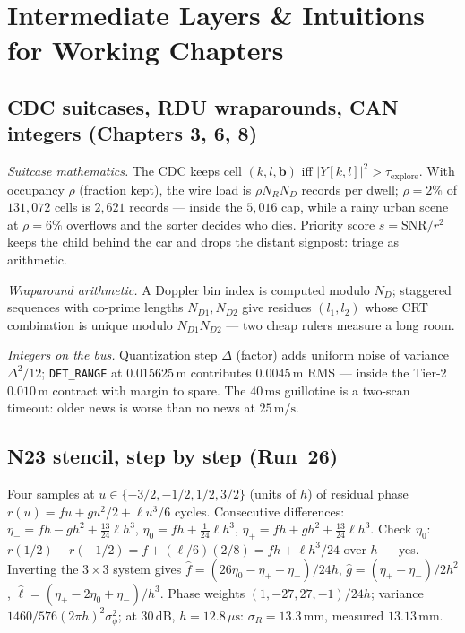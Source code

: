 \documentclass[11pt,oneside]{book}
\begin{document}
\chapter{Intermediate Layers \& Intuitions for Working Chapters}
\label{ch:intermediate}

\section{CDC suitcases, RDU wraparounds, CAN integers (Chapters 3, 6, 8)}
\label{sec:thin-fill}

\emph{Suitcase mathematics.} The CDC keeps cell $(k,l,\mathbf{b})$ iff
$|Y[k,l]|^2>\tau_{\mathrm{explore}}$. With occupancy $\rho$ (fraction kept),
the wire load is $\rho N_RN_D$ records per dwell; $\rho=2\%$ of
$131{,}072$ cells is $2{,}621$ records --- inside the $5{,}016$ cap, while a
rainy urban scene at $\rho=6\%$ overflows and the sorter decides who dies.
Priority score $s=\mathrm{SNR}/r^2$ keeps the child behind the car and drops
the distant signpost: triage as arithmetic.

\emph{Wraparound arithmetic.} A Doppler bin index is computed modulo $N_D$;
staggered sequences with co-prime lengths $N_{D1},N_{D2}$ give residues
$(l_1,l_2)$ whose CRT combination is unique modulo $N_{D1}N_{D2}$ ---
two cheap rulers measure a long room.

\emph{Integers on the bus.} Quantization step $\Delta$ (factor) adds uniform
noise of variance $\Delta^2/12$; \texttt{DET\_RANGE} at $0.015625\,\mathrm{m}$
contributes $0.0045\,\mathrm{m}$ RMS --- inside the Tier-2 $0.010\,\mathrm{m}$
contract with margin to spare. The $40\,\mathrm{ms}$ guillotine is a
two-scan timeout: older news is worse than no news at $25\,\mathrm{m/s}$.

\section{N23 stencil, step by step (Run~26)}
\label{sec:n23-steps}

Four samples at $u\in\{-3/2,-1/2,1/2,3/2\}$ (units of $h$) of residual phase
$r(u)=fu+gu^2/2+\ell u^3/6$ cycles. Consecutive differences:
$\eta_-=fh-gh^2+\tfrac{13}{24}\ell h^3$,
$\eta_0=fh+\tfrac1{24}\ell h^3$,
$\eta_+=fh+gh^2+\tfrac{13}{24}\ell h^3$.
Check $\eta_0$: $r(1/2)-r(-1/2)=f+(\ell/6)(2/8)=fh+\ell h^3/24$ over $h$ ---
yes. Inverting the $3\times3$ system gives
$\hat f=(26\eta_0-\eta_+-\eta_-)/24h$,
$\hat g=(\eta_+-\eta_-)/2h^2$,
$\hat\ell=(\eta_+-2\eta_0+\eta_-)/h^3$.
Phase weights $(1,-27,27,-1)/24h$; variance $1460/576(2\pi h)^2\sigma_\phi^2$;
at $30\,\mathrm{dB}$, $h=12.8\,\mu\mathrm{s}$: $\sigma_R=13.3\,\mathrm{mm}$,
measured $13.13\,\mathrm{mm}$.
\end{document}

